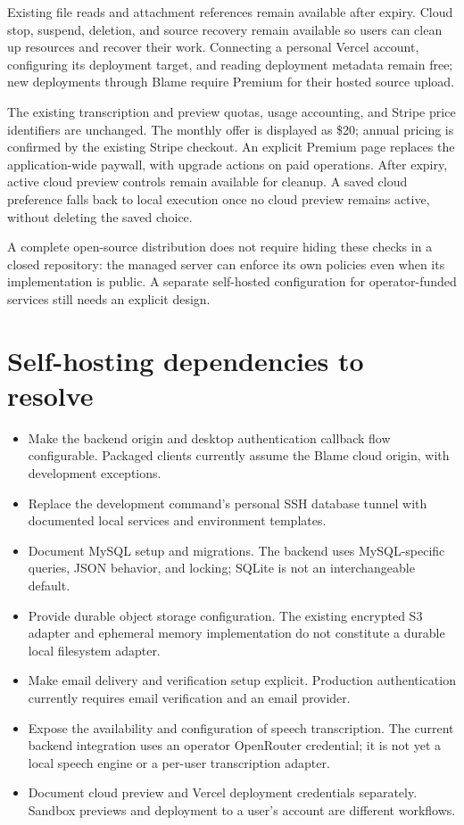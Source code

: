 \documentclass[11pt,a4paper]{article}
\begin{document}
Existing file reads and attachment references remain available after expiry.
Cloud stop, suspend, deletion, and source recovery remain available so users can
clean up resources and recover their work. Connecting a personal Vercel account,
configuring its deployment target, and reading deployment metadata remain free;
new deployments through Blame require Premium for their hosted source upload.

The existing transcription and preview quotas, usage accounting, and Stripe
price identifiers are unchanged. The monthly offer is displayed as \$20;
annual pricing is confirmed by the existing Stripe checkout. An explicit
Premium page replaces the application-wide paywall, with upgrade actions on
paid operations. After expiry, active cloud preview controls remain available
for cleanup. A saved cloud preference falls back to local execution once no
cloud preview remains active, without deleting the saved choice.

A complete open-source distribution does not require hiding these checks in a
closed repository: the managed server can enforce its own policies even when
its implementation is public. A separate self-hosted configuration for
operator-funded services still needs an explicit design.

\section{Self-hosting dependencies to resolve}
\begin{itemize}
\item Make the backend origin and desktop authentication callback flow
configurable. Packaged clients currently assume the Blame cloud origin, with
development exceptions.
\item Replace the development command's personal SSH database tunnel with
documented local services and environment templates.
\item Document MySQL setup and migrations. The backend uses MySQL-specific
queries, JSON behavior, and locking; SQLite is not an interchangeable default.
\item Provide durable object storage configuration. The existing encrypted S3
adapter and ephemeral memory implementation do not constitute a durable local
filesystem adapter.
\item Make email delivery and verification setup explicit. Production
authentication currently requires email verification and an email provider.
\item Expose the availability and configuration of speech transcription. The
current backend integration uses an operator OpenRouter credential; it is not
yet a local speech engine or a per-user transcription adapter.
\item Document cloud preview and Vercel deployment credentials separately.
Sandbox previews and deployment to a user's account are different workflows.
\end{itemize}
\end{document}
